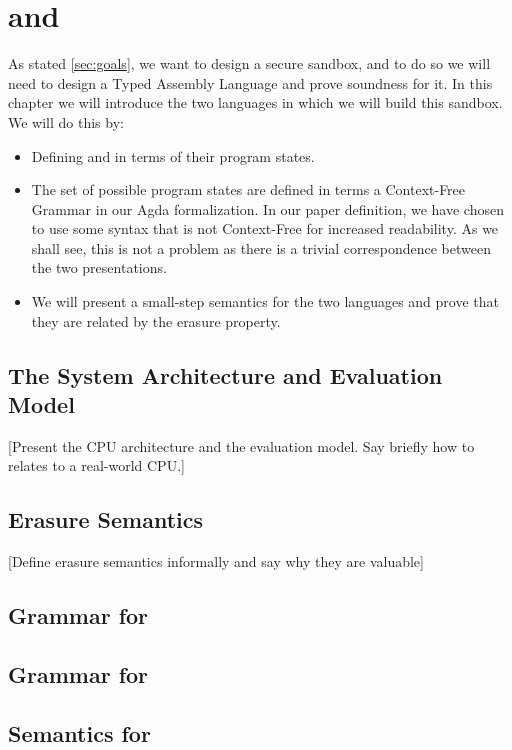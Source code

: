\chapter{\ATAL and \ATALe}
\label{chap:lang}

As stated \cref{sec:goals}, we want to design a secure sandbox, and to do so we
will need to design a Typed Assembly Language and prove soundness for it. In
this chapter we will introduce the two languages in which we will build this
sandbox. We will do this by:

\begin{itemize}
\item Defining \ATAL and \ATALe in terms of their program states.
\item The set of possible program states are defined in terms a Context-Free
  Grammar in our Agda formalization. In our paper definition, we have chosen to
  use some syntax that is not Context-Free for increased readability. As we
  shall see, this is not a problem as there is a trivial correspondence between
  the two presentations.
\item We will present a small-step semantics for the two languages and prove
  that they are related by the erasure property.
\end{itemize}

\section{The System Architecture and Evaluation Model}

[Present the CPU architecture and the evaluation model. Say briefly how to
relates to a real-world CPU.]

\section{Erasure Semantics}

[Define erasure semantics informally and say why they are valuable]

\section{Grammar for \ATALe}
\section{Grammar for \ATAL}
\section{Semantics for \ATAL}
